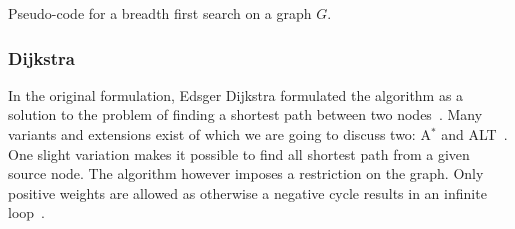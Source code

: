             \begin{algorithm}[htp]
                \hrulealg
            \caption{Pseudo-code for a breadth first search on a graph $G$.}\label{bfs}
            \end{algorithm}
        
            \subsubsection*{Dijkstra} In the original formulation, Edsger Dijkstra formulated the algorithm as a solution to the problem of finding a shortest path between two nodes~\autocite{dijkstra1959note}. 
            Many variants and extensions exist of which we are going to discuss two: A$^*$ and ALT~\autocite{hart1968formal, goldberg2005computing}. 
            One slight variation makes it possible to find all shortest path from a given source node.
            The algorithm however imposes a restriction on the graph.
            Only positive weights are allowed as otherwise a negative cycle results in an infinite loop~\autocite{cormen2009introduction}. 
            
